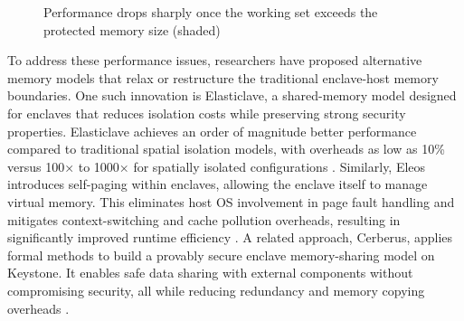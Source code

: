 \begin{figure}[htbp]
\centering
{}
\caption{Performance drops sharply once the working set exceeds the protected memory size (shaded)}
\label{fig:epc-cliff}
\end{figure}


To address these performance issues, researchers have proposed alternative memory models that relax or restructure the traditional enclave-host memory boundaries. One such innovation is Elasticlave, a shared-memory model designed for enclaves that reduces isolation costs while preserving strong security properties. Elasticlave achieves an order of magnitude better performance compared to traditional spatial isolation models, with overheads as low as 10\% versus 100× to 1000× for spatially isolated configurations \cite{yu2022elasticlave}. Similarly, Eleos introduces self-paging within enclaves, allowing the enclave itself to manage virtual memory. This eliminates host OS involvement in page fault handling and mitigates context-switching and cache pollution overheads, resulting in significantly improved runtime efficiency \cite{orenbach2023eleos}. A related approach, Cerberus, applies formal methods to build a provably secure enclave memory-sharing model on Keystone. It enables safe data sharing with external components without compromising security, all while reducing redundancy and memory copying overheads \cite{lee2022cerberus}.

